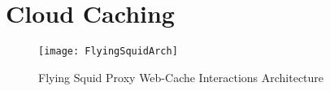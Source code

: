 \section{Cloud Caching}


\begin{figure}[H] \centering
\texttt{[image: FlyingSquidArch]}
\caption{Flying Squid Proxy Web-Cache Interactions Architecture}
\end{figure}

